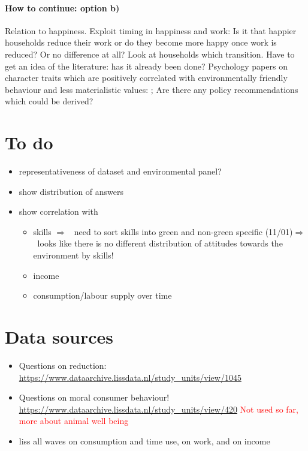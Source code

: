 \documentclass[12pt]{article}
\newcommand{\ar}{$\Rightarrow$ \ }
\newcommand{\tr}[1]{\textcolor{red}{#1}}
\begin{document}
\paragraph{How to continue: option b)}
 Relation to happiness. Exploit timing in happiness and work: Is it that happier households reduce their work or do they become more happy once work is reduced? Or no difference at all? Look at households which transition. 
 Have to get an idea of the literature: has it already been done? Psychology papers on character traits which are positively correlated with environmentally friendly behaviour and less materialistic values: \cite{Brown2005AreLifestyle,Heikkinen2015DegrowthConsumers}; Are there any policy recommendations which could be derived?


\section{To do}
\begin{itemize}
	\item representativeness of dataset and environmental panel?
	\item show distribution of answers \checkmark
	\item show correlation with 
	\begin{itemize}
		\item skills \ar need to sort skills into green and non-green specific (11/01)\ar looks like there is no different distribution of attitudes towards the environment by skills! \checkmark
		\item income
		\item consumption/labour supply over time \checkmark
	\end{itemize}
\end{itemize}

\section{Data sources}
\begin{itemize}
\item 
Questions on reduction:
\url{https://www.dataarchive.lissdata.nl/study_units/view/1045}
\item Questions on moral consumer behaviour! 
\url{https://www.dataarchive.lissdata.nl/study_units/view/420} \tr{Not used so far, more about animal well being}
\item liss all waves on consumption and time use, on work, and on income
\end{itemize}
\end{document}
